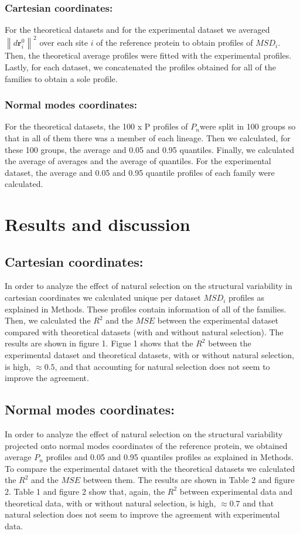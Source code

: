 \documentclass{article}
\begin{document}
\begin{multicols}{2}
{{\subsubsection*{Cartesian coordinates:} For the theoretical datasets and for the experimental dataset we averaged $\left\|d\mathbf{r}^{0}_{i}\right\|^{2}$ over each site $i$ of the reference protein to obtain profiles of $MSD_{i}$. Then, the theoretical average profiles were fitted with the experimental profiles. Lastly, for each dataset, we concatenated the profiles obtained for all of the families to obtain a sole profile.

\subsubsection*{Normal modes coordinates:} For the theoretical datasets, the 100 x P profiles of $P_{n}$were split in 100 groups so that in all of them there was a member of each lineage. Then we calculated, for these 100 groups, the average and 0.05 and 0.95 quantiles. Finally, we calculated the average of averages and the average of quantiles. 
For the experimental dataset, the average and 0.05 and 0.95 quantile profiles of each family were calculated.

\section{Results and discussion}
\subsection*{Cartesian coordinates:}
In order to analyze the effect of natural selection on the structural variability in cartesian coordinates we calculated unique per dataset $MSD_{i}$ profiles as explained in Methods. These profiles contain information of all of the families. Then, we calculated the $R^2$ and the $MSE$ between the experimental dataset compared with theoretical datasets (with and without natural selection). The results are shown in figure 1. 
Figue 1 shows that the $R^2$ between the experimental dataset and theoretical datasets, with or without natural selection, is high, $\approx 0.5$, and that accounting for natural selection does not seem to improve the agreement. 

\subsection*{Normal modes coordinates:}
In order to analyze the effect of natural selection on the structural variability projected onto normal modes coordinates of the reference protein, we obtained average $P_{n}$ profiles and 0.05 and 0.95 quantiles profiles as explained in Methods. To compare the experimental dataset with the theoretical datasets we calculated the $R^2$ and the $MSE$ between them. The results are shown in Table 2 and figure 2. Table 1 and figure 2 show that, again, the $R^2$ between experimental data and theoretical data, with or without natural selection, is high, $\approx 0.7$ and that natural selection does not seem to improve the agreement with experimental data. 


}}
\end{multicols}
\end{document}
